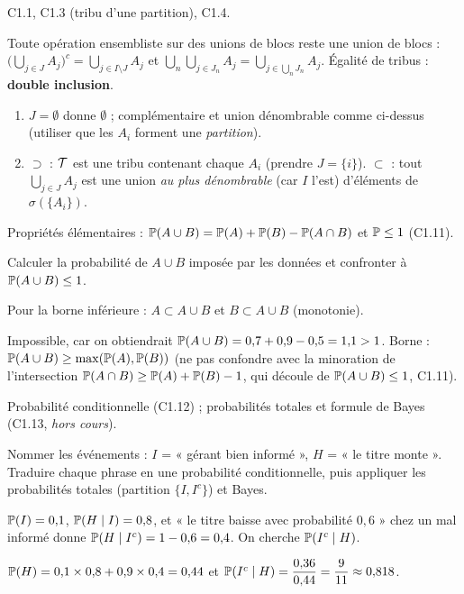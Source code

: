 \documentclass[11pt,a4paper]{article}
\begin{document}
\begin{exo}
\outils C1.1, C1.3 (tribu d'une partition), C1.4.

\meth Toute opération ensembliste sur des unions de blocs reste une union de blocs : $\bigl(\bigcup_{j\in J}A_j\bigr)^c=\bigcup_{j\in I\setminus J}A_j$
et $\bigcup_n\bigcup_{j\in J_n}A_j=\bigcup_{j\in\bigcup_nJ_n}A_j$. Égalité de tribus : \textbf{double inclusion}.

\indic
\begin{enumerate}
  \item $J=\emptyset$ donne $\emptyset$ ; complémentaire et union dénombrable comme ci-dessus (utiliser que les $A_i$ forment une \emph{partition}).
  \item $\supset$ : $\mathcal{T}$ est une tribu contenant chaque $A_i$ (prendre $J=\{i\}$). $\subset$ : tout $\bigcup_{j\in J}A_j$ est une union
  \emph{au plus dénombrable} (car $I$ l'est) d'éléments de $\sigma(\{A_i\})$.
\end{enumerate}
\end{exo}

\begin{exo}
\outils Propriétés élémentaires : $\mathbb{P}(A\cup B)=\mathbb{P}(A)+\mathbb{P}(B)-\mathbb{P}(A\cap B)$ et $\mathbb{P}\le1$ (C1.11).

\meth Calculer la probabilité de $A\cup B$ imposée par les données et confronter à $\mathbb{P}(A\cup B)\le1$.

\indic Pour la borne inférieure : $A\subset A\cup B$ et $B\subset A\cup B$ (monotonie).

\rep Impossible, car on obtiendrait $\mathbb{P}(A\cup B)=0{,}7+0{,}9-0{,}5=1{,}1>1$. Borne : $\mathbb{P}(A\cup B)\ge\max(\mathbb{P}(A),\mathbb{P}(B))$
(ne pas confondre avec la minoration de l'intersection $\mathbb{P}(A\cap B)\ge\mathbb{P}(A)+\mathbb{P}(B)-1$, qui découle de $\mathbb{P}(A\cup B)\le1$, C1.11).
\end{exo}

\begin{exo}
\outils Probabilité conditionnelle (C1.12) ; probabilités totales et formule de Bayes (C1.13, \emph{hors cours}).

\meth Nommer les événements : $I$ = « gérant bien informé », $H$ = « le titre monte ». Traduire chaque phrase en une probabilité
conditionnelle, puis appliquer les probabilités totales (partition $\{I,I^c\}$) et Bayes.

\indic $\mathbb{P}(I)=0{,}1$, $\mathbb{P}(H\mid I)=0{,}8$, et « le titre baisse avec probabilité $0{,}6$ » chez un mal informé donne
$\mathbb{P}(H\mid I^c)=1-0{,}6=0{,}4$. On cherche $\mathbb{P}(I^c\mid H)$.

\rep $\mathbb{P}(H)=0{,}1\times0{,}8+0{,}9\times0{,}4=0{,}44$ et $\mathbb{P}(I^c\mid H)=\dfrac{0{,}36}{0{,}44}=\dfrac9{11}\approx0{,}818$.
\end{exo}
\end{document}
